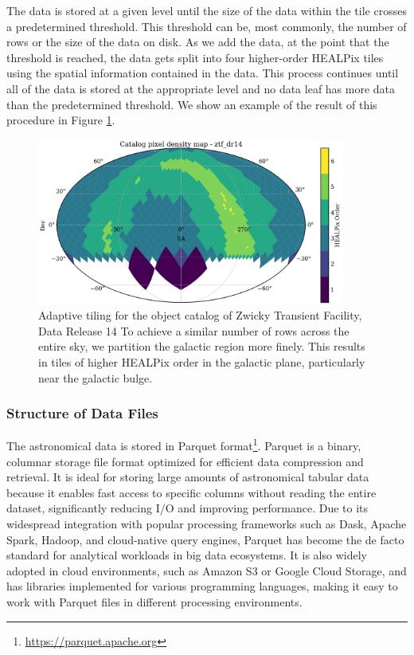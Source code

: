 \documentclass[11pt,a4paper]{ivoa}
\begin{document}
The data is stored at a given level until the size of the data within the tile crosses a predetermined threshold. 
This threshold can be, most commonly, the number of rows or the size of the data on disk. 
As we add the data, at the point that the threshold is reached, the data gets split into four higher-order HEALPix tiles using the spatial information contained in the data. 
This process continues until all of the data is stored at the appropriate level and no data leaf has more data than the predetermined threshold. We show an example of the result of this procedure in Figure \ref{fig:order}.

\begin{figure}
\centering
\includegraphics[width=0.9\textwidth]{order-pix.png}
\caption{Adaptive tiling for the object catalog of Zwicky Transient Facility, Data Release 14 \citep{ztf:Bellm2019, ztf:Masci2019} To achieve a similar number of rows across the entire sky, we partition the galactic region more finely. This results in tiles of higher HEALPix order in the galactic plane, particularly near the galactic bulge. }
\label{fig:order}
\end{figure}


\subsubsection{Structure of Data Files} \label{sec:parquet}
The astronomical data is stored in Parquet format\footnote{\href{https://parquet.apache.org}{https://parquet.apache.org}}.
Parquet is a binary, columnar storage file format optimized for efficient data compression and retrieval.
It is ideal for storing large amounts of astronomical tabular data because it enables fast access to specific columns without reading the entire dataset, significantly reducing I/O and improving performance.
Due to its widespread integration with popular processing frameworks such as Dask, Apache Spark, Hadoop, and cloud-native query engines, Parquet has become the de facto standard for analytical workloads in big data ecosystems.
It is also widely adopted in cloud environments, such as Amazon S3 or Google Cloud Storage, and has libraries implemented for various programming languages, making it easy to work with Parquet files in different processing environments. \par
\end{document}
